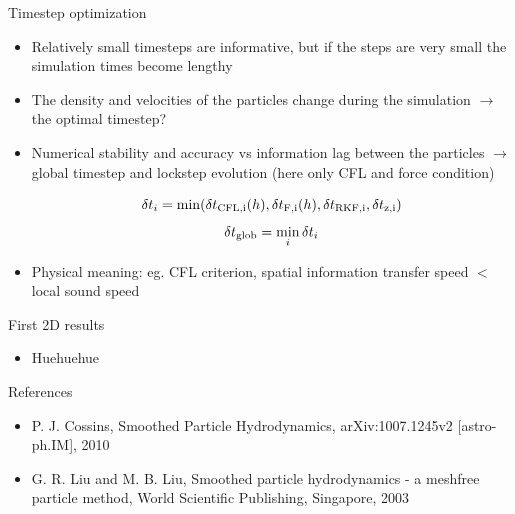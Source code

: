 \documentclass{beamer}
\begin{document}
\begin{frame}{Timestep optimization}
\begin{itemize}

\item Relatively small timesteps are informative, but if the steps are very small the simulation times become lengthy
\item The density and velocities of the particles change during the simulation $\rightarrow$ the optimal timestep?
\item Numerical stability and accuracy vs information lag between the particles $\rightarrow$ global timestep and lockstep evolution (here only CFL and force condition)

\begin{equation}
\delta t_{i} = \min(\delta t_{\rm CFL,i}(h),\delta t_{\rm F,i}(h),\delta t_{\rm RKF,i},\delta t_{\rm 
z,i})
\end{equation}
\begin{equation}
\delta t_{\rm glob} = \min_i{\delta t_i}
\end{equation}

\item Physical meaning: eg. CFL criterion, spatial information transfer speed $<$ local sound speed

\end{itemize}
\end{frame}


\begin{frame}{First 2D results}
\begin{itemize}

\item Huehuehue

\end{itemize}
\end{frame}

\begin{frame}{References}
\begin{itemize}

\item P. J. Cossins, Smoothed Particle Hydrodynamics, arXiv:1007.1245v2 [astro-ph.IM], 2010 

\item G. R. Liu and M. B. Liu, Smoothed particle hydrodynamics - a meshfree particle method, World Scientific Publishing, Singapore, 2003

\end{itemize}
\end{frame}
\end{document}
